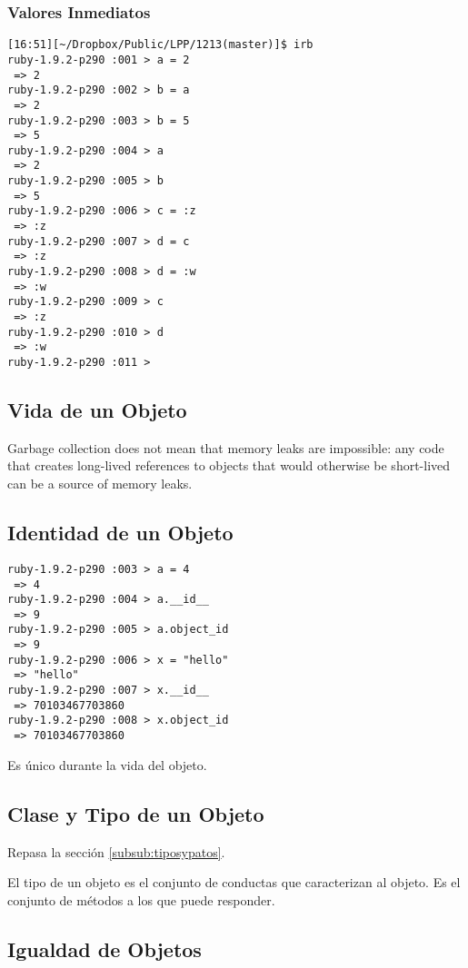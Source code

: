 \subsubsection{Valores Inmediatos}

\begin{verbatim}
[16:51][~/Dropbox/Public/LPP/1213(master)]$ irb
ruby-1.9.2-p290 :001 > a = 2
 => 2 
ruby-1.9.2-p290 :002 > b = a
 => 2 
ruby-1.9.2-p290 :003 > b = 5
 => 5 
ruby-1.9.2-p290 :004 > a
 => 2 
ruby-1.9.2-p290 :005 > b
 => 5 
ruby-1.9.2-p290 :006 > c = :z
 => :z 
ruby-1.9.2-p290 :007 > d = c
 => :z 
ruby-1.9.2-p290 :008 > d = :w
 => :w 
ruby-1.9.2-p290 :009 > c
 => :z 
ruby-1.9.2-p290 :010 > d
 => :w 
ruby-1.9.2-p290 :011 > 

\end{verbatim}

\subsection{Vida de un Objeto}

Garbage collection does not mean that memory leaks are impossible:
any code that creates long-lived references to objects that would otherwise be short-lived can be a
source of memory leaks.

\subsection{Identidad de un Objeto}
\begin{verbatim}
ruby-1.9.2-p290 :003 > a = 4
 => 4 
ruby-1.9.2-p290 :004 > a.__id__
 => 9 
ruby-1.9.2-p290 :005 > a.object_id
 => 9 
ruby-1.9.2-p290 :006 > x = "hello"
 => "hello" 
ruby-1.9.2-p290 :007 > x.__id__
 => 70103467703860 
ruby-1.9.2-p290 :008 > x.object_id
 => 70103467703860 

\end{verbatim}

Es único durante la vida del objeto.
\subsection{Clase y Tipo de un Objeto}

Repasa la sección \ref{subsub:tiposypatos}.

El tipo de un objeto es el conjunto de conductas que caracterizan al objeto.
Es el conjunto de métodos a los que puede responder.


\subsection{Igualdad de Objetos}



